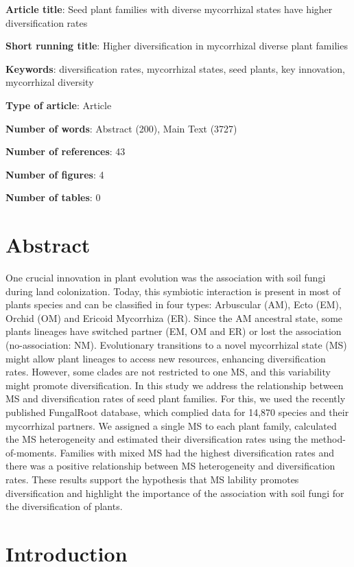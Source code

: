 \documentclass[12pt,]{article}
\title{}
\author{}
\date{}
\begin{document}
\textbf{Article title}: Seed plant families with diverse mycorrhizal
states have higher diversification rates

\textbf{Short running title}: Higher diversification in mycorrhizal
diverse plant families

\textbf{Keywords}: diversification rates, mycorrhizal states, seed
plants, key innovation, mycorrhizal diversity

\textbf{Type of article}: Article

\textbf{Number of words}: Abstract (200), Main Text (3727)

\textbf{Number of references}: 43

\textbf{Number of figures}: 4

\textbf{Number of tables}: 0

\pagebreak

\hypertarget{abstract}{%
\section{Abstract}\label{abstract}}

One crucial innovation in plant evolution was the association with soil
fungi during land colonization. Today, this symbiotic interaction is
present in most of plants species and can be classified in four types:
Arbuscular (AM), Ecto (EM), Orchid (OM) and Ericoid Mycorrhiza (ER).
Since the AM ancestral state, some plants lineages have switched partner
(EM, OM and ER) or lost the association (no-association: NM).
Evolutionary transitions to a novel mycorrhizal state (MS) might allow
plant lineages to access new resources, enhancing diversification rates.
However, some clades are not restricted to one MS, and this variability
might promote diversification. In this study we address the relationship
between MS and diversification rates of seed plant families. For this,
we used the recently published FungalRoot database, which complied data
for 14,870 species and their mycorrhizal partners. We assigned a single
MS to each plant family, calculated the MS heterogeneity and estimated
their diversification rates using the method-of-moments. Families with
mixed MS had the highest diversification rates and there was a positive
relationship between MS heterogeneity and diversification rates. These
results support the hypothesis that MS lability promotes diversification
and highlight the importance of the association with soil fungi for the
diversification of plants.

\hypertarget{introduction}{%
\section{Introduction}\label{introduction}}
\end{document}
